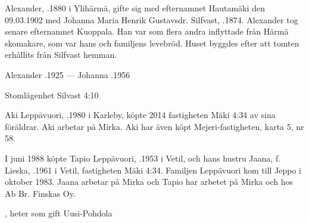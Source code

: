 Alexander, .1880 i Ylihärmä, gifte sig med efternamnet Hautamäki den 09.03.1902 med Johanna Maria Henrik Gustavsdr. Silfvast, .1874. Alexander tog senare efternamnet Kuoppala. Han var som flera andra inflyttade från Härmä skomakare, som var hans och familjens levebröd. Huset byggdes efter att tomten erhållits från Silfvast hemman.
\begin{jhchildren}
  \item {}
  \item {}
  \item {}
  \item {}
  \item {}
  \item {}
  \item {}
  \item {}
\end{jhchildren}

Alexander .1925  ---  Johanna .1956




Stomlägenhet Silvast 4:10


Aki Leppävuori, .1980 i Karleby, köpte 2014 fastigheten Mäki 4:34 av sina föräldrar. Aki arbetar på Mirka. Aki har även köpt Mejeri-fastigheten, karta 5, nr 58.\jhvspace{}


I juni 1988 köpte Tapio Leppävuori, .1953 i Vetil, och	hans hustru Jaana, f. Lieska, .1961 i Vetil, fastigheten Mäki 4:34. Familjen Leppävuori kom till Jeppo i oktober 1983. Jaana arbetar på Mirka och Tapio har arbetet på Mirka och hos Ab Br. Finskas Oy.
\begin{jhchildren}
  \item {}
  \item {}, heter som gift Uusi-Pohdola
\end{jhchildren}


